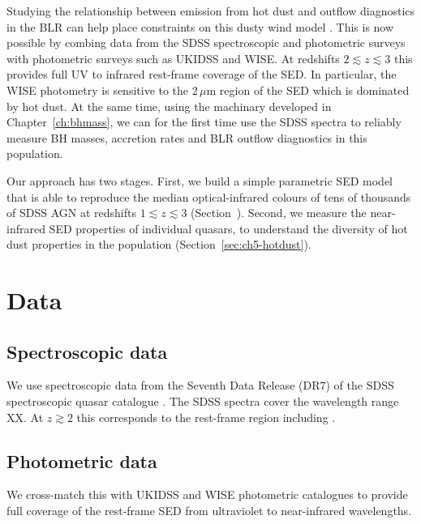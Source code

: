 Studying the relationship between emission from hot dust and outflow diagnostics in the BLR can help place constraints on this dusty wind model \citep[e.g.][]{wang13}. 
This is now possible by combing data from the SDSS spectroscopic and photometric surveys with photometric surveys such as UKIDSS and WISE. 
At redshifts $2\lesssim z \lesssim3$ this provides full UV to infrared rest-frame coverage of the SED.
In particular, the WISE photometry is sensitive to the 2\,$\mu$m region of the SED which is dominated by hot dust.
At the same time, using the machinary developed in Chapter~\ref{ch:bhmass}, we can for the first time use the SDSS spectra to reliably measure BH masses, accretion rates and BLR outflow diagnostics in this population. 
 
Our approach has two stages. 
First, we build a simple parametric SED model that is able to reproduce the median optical-infrared colours of tens of thousands of SDSS AGN at redshifts $1 \lesssim z \lesssim 3$ (Section~\label{sec:ch5-standardmodel}). 
Second, we measure the near-infrared SED properties of individual quasars, to understand the diversity of hot dust properties in the population (Section~\ref{sec:ch5-hotdust}).

\section{Data}

\subsection{Spectroscopic data}

We use spectroscopic data from the Seventh Data Release (DR$7$) of the SDSS spectroscopic quasar catalogue \citep{schneider10}.
The SDSS spectra cover the wavelength range XX. 
At $z\gtrsim2$ this corresponds to the rest-frame region including . 


\subsection{Photometric data}

We cross-match this with UKIDSS and WISE photometric catalogues to provide full coverage of the rest-frame SED from ultraviolet to near-infrared wavelengths.    

